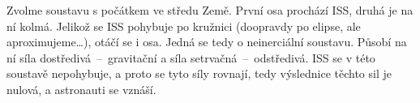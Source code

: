 \documentclass{../../../../style/mkimain}
\begin{document}
\noindent{}
\klein
Zvolme soustavu s počátkem ve středu Země. První osa prochází ISS, druhá je na ní kolmá. 
Jelikož se ISS pohybuje po kružnici (doopravdy po elipse, ale aproximujeme\dots), otáčí se i osa.
Jedná se tedy o neinerciální soustavu.
Působí na ní síla dostředivá~–~gravitační a síla setrvačná~–~odstředivá.
ISS se v této soustavě nepohybuje, a proto se tyto síly rovnají, tedy výslednice těchto sil je nulová, a astronauti se vznáší.
\end{document}
